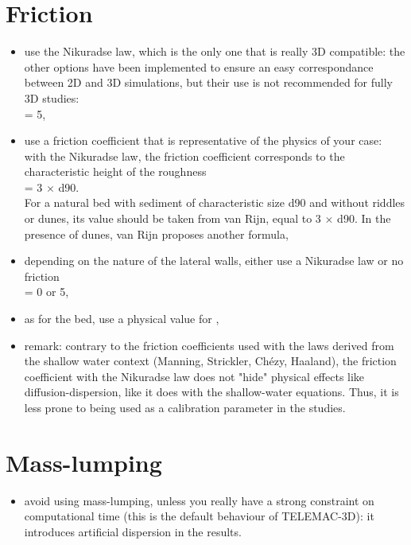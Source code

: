 \section{Friction}
\begin{itemize}
\item use the Nikuradse law, which is the only one that is really 3D compatible:
the other options have been implemented to ensure an easy correspondance between 2D and 3D simulations,
but their use is not recommended for fully 3D studies:\\
   = 5,\\
\item use a friction coefficient that is representative of the physics of your case:
with the Nikuradse law, the friction coefficient corresponds to the characteristic height of the roughness \\
   = 3 $\times$ d90.\\
  For a natural bed with sediment of characteristic size d90 and without riddles or dunes,
its value should be taken from van Rijn, equal to 3 $\times$ d90.
In the presence of dunes, van Rijn proposes another formula,
\item depending on the nature of the lateral walls, either use a Nikuradse law or no friction \\
   = 0 or 5,
\item as for the bed, use a physical value for ,
\item remark: contrary to the friction coefficients used with the laws derived
from the shallow water context (Manning, Strickler, Chézy, Haaland),
the friction coefficient with the Nikuradse law does not "hide" physical effects
like diffusion-dispersion, like it does with the shallow-water equations.
Thus, it is less prone to being used as a calibration parameter in the studies.
\end{itemize}

\section{Mass-lumping}
\begin{itemize}
\item avoid using mass-lumping, unless you really have a strong constraint on computational time
(this is the default behaviour of TELEMAC-3D): it introduces artificial dispersion in the results.
\end{itemize}


